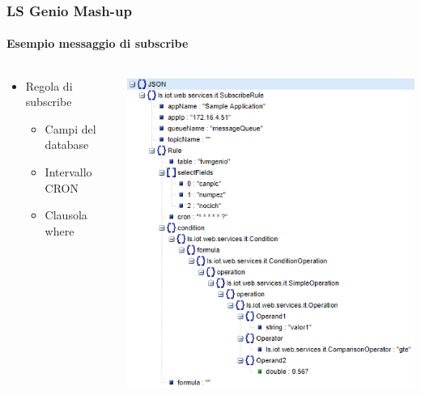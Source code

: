 \documentclass{beamer}
\begin{document}
\begin{frame}
\frametitle{LS Genio Mash-up}
\framesubtitle{Esempio messaggio di subscribe}
\begin{columns}[T] %
	\begin{column}{.38\textwidth}
		\begin{itemize}
			\item Regola di subscribe
			\begin{itemize}
				\item Campi del database
				\item Intervallo CRON
				\item Clausola where
			\end{itemize}
		\end{itemize}
		
	\end{column}%
	\hfill%
	\begin{column}{.58\textwidth}
		\includegraphics[width=1\textwidth]{images/subscribe-json-1.png}
	\end{column}%
\end{columns}
\end{frame}
\end{document}
